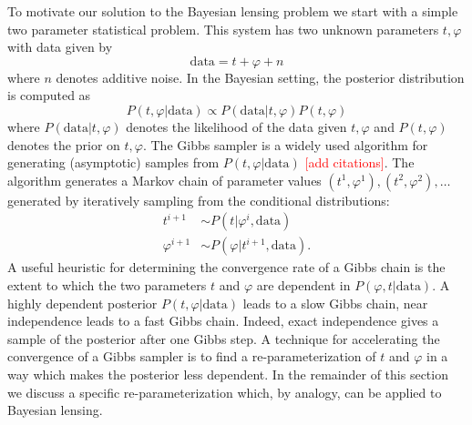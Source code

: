 \documentclass[noinfoline]{imsart}
\begin{document}
To motivate our solution to the Bayesian lensing problem we start with a simple two parameter statistical problem.  This system has two unknown parameters $ t, \varphi$ with data given by
\[\text{data} =  t + \varphi + n\]
where $n$ denotes additive noise.  In the Bayesian setting, the posterior distribution is computed as 
\begin{equation}
\label{post1}
 P( t,\varphi|\text{data})\propto P(\text{data}| t, \varphi) P( t,\varphi) 
 \end{equation}
where $P(\text{data}| t, \varphi)$ denotes the likelihood of the data given  $ t, \varphi$ and $P( t,\varphi)$ denotes the  prior on $ t, \varphi$. 
The Gibbs sampler is a widely used algorithm for generating (asymptotic) samples from  $P( t, \varphi|\text{data})$ \textcolor{red}{[add citations]}. The algorithm generates a Markov chain of parameter values $( t^{1}, \varphi^{1}), ( t^{2}, \varphi^{2}),\ldots$ generated by iteratively sampling from the conditional distributions:
\begin{align*}
 t^{i+1} &\sim P( t|\varphi^i,\text{data})\\
\varphi^{i+1}   &\sim P(\varphi| t^{i+1},\text{data}).
\end{align*}
A useful heuristic for determining the convergence rate of a Gibbs chain is the extent to which the two parameters $ t$ and $\varphi$ are dependent in $P(\varphi,  t|\text{data})$. A highly dependent posterior $P( t, \varphi|\text{data})$ leads to a slow Gibbs chain, near independence leads to a fast Gibbs chain. Indeed, exact independence gives a sample of the posterior after one Gibbs step.  A technique for accelerating the convergence of a Gibbs sampler is to find a  re-parameterization of $ t$ and $\varphi$ in a way which makes the posterior less dependent. In the remainder of this section we discuss a specific re-parameterization which, by analogy, can be applied to Bayesian lensing.
\end{document}
